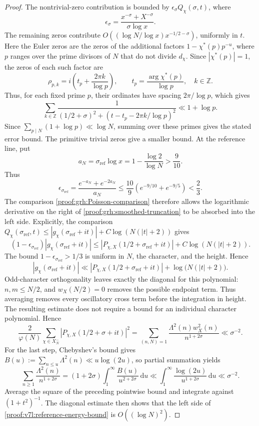 \documentclass[12pt,a4paper]{amsart}
\numberwithin{equation}{section}
\def\le{\leqslant}
\def\ge{\geqslant}
\theoremstyle{plain}
\theoremstyle{definition}
\theoremstyle{remark}
\begin{document}
\begin{proof}
The nontrivial-zero contribution is bounded by
$\epsilon_\sigma Q_\chi(\sigma,t)$, where
\[
 \epsilon_\sigma=
       \frac{x^{-\sigma}+X^{-\sigma}}{\sigma\log x}.
\]
The remaining zeros contribute
$O((\log N/\log x)x^{-1/2-\sigma})$, uniformly in $t$.
Here the Euler zeros are the zeros of the additional factors
$1-\chi^*(p)p^{-u}$, where $p$ ranges over the prime divisors
of $N$ that do not divide $d_\chi$. Since $|\chi^*(p)|=1$,
the zeros of each such factor are
\[
 \rho_{p,k}=i\left(t_p+\frac{2\pi k}{\log p}\right),
 \qquad t_p=\frac{\arg\chi^*(p)}{\log p},\quad k\in\mathbb Z.
\]
Thus, for each fixed prime $p$, their ordinates have spacing
$2\pi/\log p$, which gives
\[
 \sum_{k\in\mathbb Z}
 \frac1{(1/2+\sigma)^2+(t-t_p-2\pi k/\log p)^2}
 \ll 1+\log p.
\]
Since $\sum_{p\mid N}(1+\log p)\ll\log N$, summing over these
primes gives the stated error bound. The primitive trivial zeros
give a smaller bound.
At the reference line, put
\[
 a_N=\sigma_{\mathrm{ref}}\log x
     =1-\frac{\log2}{\log N}>\frac9{10}.
\]
Thus
\[
 \epsilon_{\sigma_{\mathrm{ref}}}
 =\frac{e^{-a_N}+e^{-2a_N}}{a_N}
 \le\frac{10}{9}\left(e^{-9/10}+e^{-9/5}\right)<\frac23.
\]
The comparison \eqref{proof:grh:Poisson-comparison} therefore allows the logarithmic
derivative on the right of \eqref{proof:grh:smoothed-truncation} to be
absorbed into the left side. Explicitly, the comparison
$Q_\chi(\sigma_{\mathrm{ref}},t)\le |g_\chi(\sigma_{\mathrm{ref}}+it)|+
C\log(N(|t|+2))$ gives
\[
 (1-\epsilon_{\sigma_{\mathrm{ref}}})|g_\chi(\sigma_{\mathrm{ref}}+it)|
 \le |P_{\chi,X}(1/2+\sigma_{\mathrm{ref}}+it)|
       +C\log(N(|t|+2)).
\]
The bound $1-\epsilon_{\sigma_{\mathrm{ref}}}>1/3$ is uniform in $N$,
the character, and the height. Hence
\[
 |g_\chi(\sigma_{\mathrm{ref}}+it)|
 \ll |P_{\chi,X}(1/2+\sigma_{\mathrm{ref}}+it)|
                      +\log\bigl(N(|t|+2)\bigr).
\]
Odd-character orthogonality leaves exactly the diagonal for this
polynomial: $n,m\le N/2$, and $w_X(N/2)=0$ removes the possible
endpoint term.
Thus averaging removes every oscillatory cross term before the
integration in height. The resulting estimate does not require a bound
for an individual character polynomial.
Hence
\[
 \frac2{\varphi(N)}\sum_{\chi\in X_N^-}
 |P_{\chi,X}(1/2+\sigma+it)|^2
 =\sum_{(n,N)=1}\frac{\Lambda^2(n)w_X^2(n)}{n^{1+2\sigma}}
 \ll\sigma^{-2}.
\]
For the last step, Chebyshev's bound gives
$B(u):=\sum_{n\le u}\Lambda^2(n)\ll u\log(2u)$, so partial summation yields
\[
 \sum_{n\ge1}\frac{\Lambda^2(n)}{n^{1+2\sigma}}
 =(1+2\sigma)\int_1^\infty\frac{B(u)}{u^{2+2\sigma}}\,\mathrm{d}u
 \ll\int_1^\infty\frac{\log(2u)}{u^{1+2\sigma}}\,\mathrm{d}u
 \ll\sigma^{-2}.
\]
Average the square of the preceding pointwise bound and integrate
against $(1+t^2)^{-1}$. The diagonal estimate then shows that the
left side of \eqref{proof:v7l:reference-energy-bound} is $O((\log N)^2)$.


\end{proof}
\end{document}
